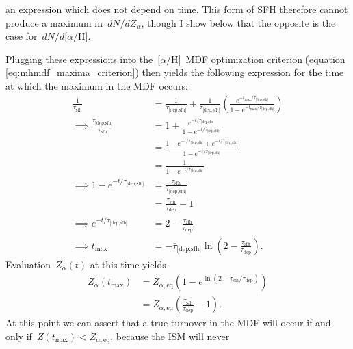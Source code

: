\documentclass[12pt]{article}
\newcommand{\ah}{\ensuremath{\text{[$\alpha$/H]}}}
\newcommand{\timescale}[1]{\ensuremath{\tau_\text{#1}}}
\newcommand{\harmonic}[2]{\ensuremath{\bar{\tau}_\text{[#1,#2]}}}
\begin{document}
an expression which does not depend on time.
This form of SFH therefore cannot produce a maximum in~$dN / dZ_\alpha$, though
I show below that the opposite is the case for~$dN / d\ah$.
\par
Plugging these expressions into the~\ah~MDF optimization criterion (equation
\ref{eq:mhmdf_maxima_criterion}) then yields the following expression for the
time at which the maximum in the MDF occurs:
\begin{subequations}\begin{align}
\frac{1}{\timescale{sfh}} &= \frac{1}{\harmonic{dep}{sfh}} +
\frac{1}{\harmonic{dep}{sfh}} \left(\frac{
	e^{-t_\text{max} / \harmonic{dep}{sfh}}
}{
	1 - e^{-t_\text{max} / \harmonic{dep}{sfh}}
}\right)
\\
\implies \frac{\harmonic{dep}{sfh}}{\timescale{sfh}} &= 1 + \frac{
	e^{-t / \harmonic{dep}{sfh}}
}{
	1 - e^{-t / \harmonic{dep}{sfh}}
}
\\
&= \frac{
	1 - e^{-t / \harmonic{dep}{sfh}} + e^{-t / \harmonic{dep}{sfh}}
}{
	1 - e^{-t / \harmonic{dep}{sfh}}
}
\\
&= \frac{1}{1 - e^{-t / \harmonic{dep}{sfh}}}
\\
\implies 1 - e^{-t / \harmonic{dep}{sfh}} &= \frac{\timescale{sfh}}{
	\harmonic{dep}{sfh}
} 
\\
&= \frac{\timescale{sfh}}{\timescale{dep}} - 1
\\
\implies e^{-t / \harmonic{dep}{sfh}} &= 2 - \frac{\timescale{sfh}}{
	\timescale{dep}
}
\\
\implies t_\text{max} &= -\harmonic{dep}{sfh} \ln \left( 2 -
\frac{\timescale{sfh}}{\timescale{dep}}\right).
\end{align}\end{subequations}
Evaluation~$Z_\alpha(t)$ at this time yields
\begin{subequations}\begin{align}
Z_\alpha(t_\text{max}) &= Z_{\alpha,\text{eq}} \left(
1 - e^{\ln \left(2 - \timescale{sfh} / \timescale{dep}\right)}
\right)
\\
&= Z_{\alpha,\text{eq}} \left(\frac{\timescale{sfh}}{\timescale{dep}} -
1\right).
\end{align}\end{subequations}
At this point we can assert that a true turnover in the MDF will occur if and
only if~$Z(t_\text{max}) < Z_{\alpha,\text{eq}}$, because the ISM will never
\end{document}
